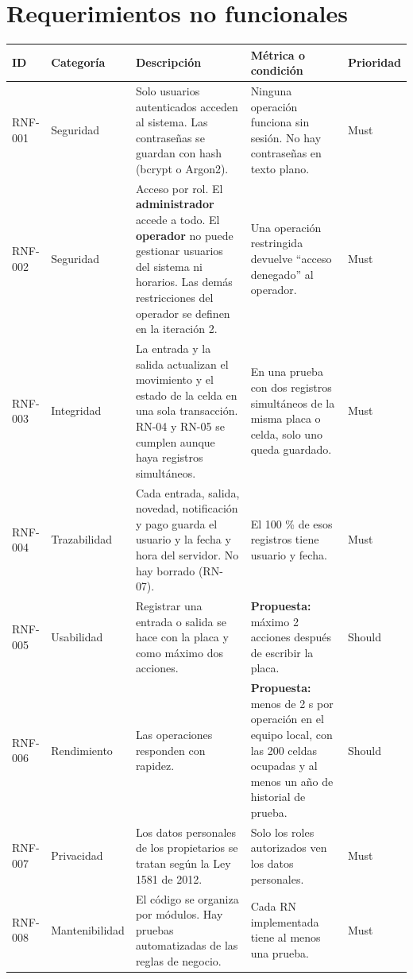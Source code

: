 \section{Requerimientos no funcionales}
\begin{longtable}{>{\raggedright\arraybackslash}p{1.7cm}>{\raggedright\arraybackslash}p{2.3cm}>{\raggedright\arraybackslash}p{5.3cm}>{\raggedright\arraybackslash}p{3.6cm}>{\raggedright\arraybackslash}p{1.5cm}}
\toprule
\textbf{ID} & \textbf{Categoría} & \textbf{Descripción} & \textbf{Métrica o condición} & \textbf{Prioridad}\\
\midrule\endhead
RNF-001 & Seguridad & Solo usuarios autenticados acceden al sistema. Las contraseñas se guardan con hash (bcrypt o Argon2). & Ninguna operación funciona sin sesión. No hay contraseñas en texto plano. & Must\\
RNF-002 & Seguridad & Acceso por rol. El \textbf{administrador} accede a todo. El \textbf{operador} no puede gestionar usuarios del sistema ni horarios. Las demás restricciones del operador se definen en la iteración 2. & Una operación restringida devuelve ``acceso denegado'' al operador. & Must\\
RNF-003 & Integridad & La entrada y la salida actualizan el movimiento y el estado de la celda en una sola transacción. RN-04 y RN-05 se cumplen aunque haya registros simultáneos. & En una prueba con dos registros simultáneos de la misma placa o celda, solo uno queda guardado. & Must\\
RNF-004 & Trazabilidad & Cada entrada, salida, novedad, notificación y pago guarda el usuario y la fecha y hora del servidor. No hay borrado (RN-07). & El 100 \% de esos registros tiene usuario y fecha. & Must\\
RNF-005 & Usabilidad & Registrar una entrada o salida se hace con la placa y como máximo dos acciones. & \textbf{Propuesta:} máximo 2 acciones después de escribir la placa. & Should\\
RNF-006 & Rendimiento & Las operaciones responden con rapidez. & \textbf{Propuesta:} menos de 2 s por operación en el equipo local, con las 200 celdas ocupadas y al menos un año de historial de prueba. & Should\\
RNF-007 & Privacidad & Los datos personales de los propietarios se tratan según la Ley 1581 de 2012. & Solo los roles autorizados ven los datos personales. & Must\\
RNF-008 & Mantenibilidad & El código se organiza por módulos. Hay pruebas automatizadas de las reglas de negocio. & Cada RN implementada tiene al menos una prueba. & Must\\

\end{longtable}
